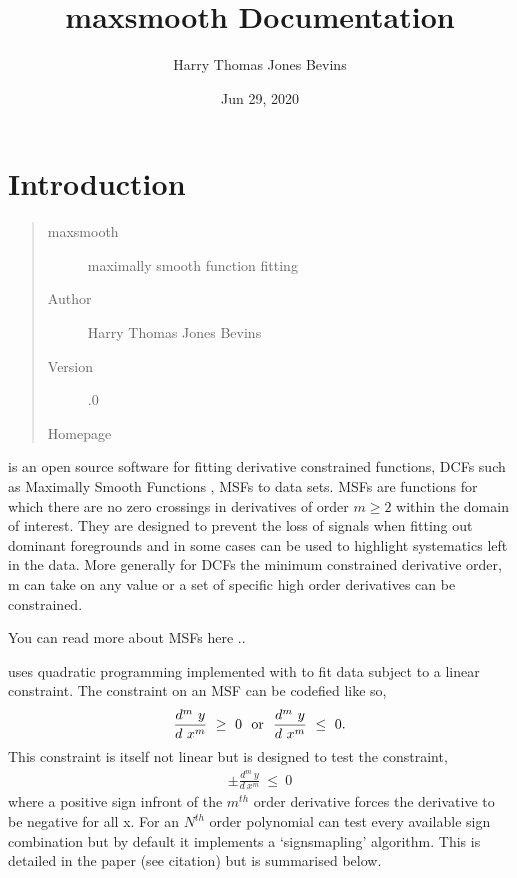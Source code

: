 \documentclass[letterpaper,10pt,english]{sphinxmanual}
\title{maxsmooth Documentation}
\date{Jun 29, 2020}
\author{Harry Thomas Jones Bevins}
\begin{document}
\pagestyle{empty}
\sphinxmaketitle
\pagestyle{plain}
\sphinxtableofcontents
\pagestyle{normal}
\label{\detokenize{source/index::doc}}



\chapter{Introduction}
\label{\detokenize{source/intro:introduction}}\begin{quote}\begin{description}
\item[{maxsmooth}] \leavevmode
maximally smooth function fitting

\item[{Author}] \leavevmode
Harry Thomas Jones Bevins

\item[{Version}] .0

\item[{Homepage}] \leavevmode
{}

\end{description}\end{quote}

 is an open source software for fitting derivative constrained
functions, DCFs such as Maximally Smooth Functions
, MSFs to data sets. MSFs are functions for which there are no zero
crossings in derivatives of order \(m \geq 2\) within the domain of interest.
They are designed to prevent the loss of
signals when fitting out dominant foregrounds and in some cases can be used to
highlight systematics left in the data. More generally for DCFs the minimum
constrained derivative order, m can take on any value or a set of
specific high order derivatives can be constrained.

You can read more about MSFs here ..

 uses quadratic programming implemented with  to fit
data subject to a linear constraint. The constraint on an MSF can be codefied
like so,
\begin{equation*}
\begin{split}\frac{d^m~y}{d~x^m}~\geq~0~~\textnormal{or}~~\frac{d^m~y}{d~x^m}~\leq~0.\end{split}
\end{equation*}
This constraint is itself not linear but  is designed to test the
constraint,
\begin{equation*}
\begin{split}\pm \frac{d^m~y}{d~x^m}~\leq~0\end{split}
\end{equation*}
where a positive sign infront of the \(m^{th}\) order derivative forces the derivative
to be negative for all x. For an \(N^{th}\) order polynomial  can test
every available sign combination but by default it implements a ‘sign\sphinxhyphen{}smapling’
algorithm. This is detailed in the  paper (see citation) but is summarised
below.
\end{document}
